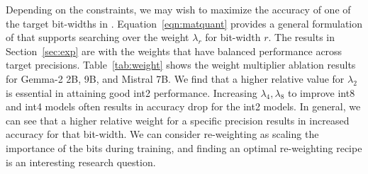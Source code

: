 Depending on the constraints, we may wish to maximize the accuracy of one of the target bit-widths in \alg. Equation~\ref{eqn:matquant} provides a general formulation of \alg that supports searching over the weight $\lambda_r$ for bit-width $r$. The results in Section~\ref{sec:exp} are with the weights that have balanced performance across target precisions. Table~\ref{tab:weight} shows the weight multiplier ablation results for Gemma-2 2B, 9B, and Mistral 7B. We find that a higher relative value for $\lambda_2$ is essential in attaining good int2 performance. Increasing $\lambda_4,\lambda_8$ to improve int8 and int4 models often results in accuracy drop for the int2 models. In general, we can see that a higher relative weight for a specific precision results in increased accuracy for that bit-width. We can consider re-weighting as scaling the importance of the bits during training, and finding an optimal re-weighting recipe is an interesting research question.


 
